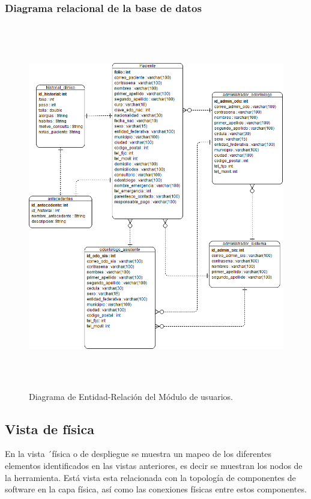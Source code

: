 \subsubsection{Diagrama relacional de la base de datos}
\begin{figure}[H]
\centering
\includegraphics[height=16cm, keepaspectratio]{pictures/diagrama_er.png}
\caption{Diagrama de Entidad-Relación del Módulo de usuarios.}
\end{figure}


\newpage
\subsection{Vista de física}

En la vista ´física o de despliegue se muestra un mapeo de los diferentes elementos identificados en las vistas anteriores, es decir se muestran los nodos de la herramienta. Está vista esta relacionada con la topología de componentes de software en la capa física, así como las conexiones físicas entre estos componentes.


